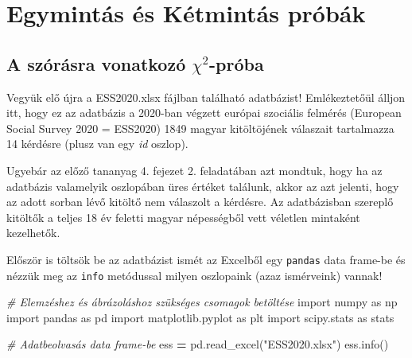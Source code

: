 \documentclass[
]{book}
\newenvironment{Shaded}{\begin{snugshade}}{\end{snugshade}}
\newcommand{\CommentTok}[1]{\textcolor[rgb]{0.56,0.35,0.01}{\textit{#1}}}
\newcommand{\ImportTok}[1]{#1}
\newcommand{\NormalTok}[1]{#1}
\newcommand{\OperatorTok}[1]{\textcolor[rgb]{0.81,0.36,0.00}{\textbf{#1}}}
\newcommand{\StringTok}[1]{\textcolor[rgb]{0.31,0.60,0.02}{#1}}
\begin{document}
\chapter{Egymintás és Kétmintás próbák}\label{egymintuxe1s-uxe9s-kuxe9tmintuxe1s-pruxf3buxe1k}

\section{\texorpdfstring{A szórásra vonatkozó \(\chi^2\)-próba}{A szórásra vonatkozó \textbackslash chi\^{}2-próba}}\label{a-szuxf3ruxe1sra-vonatkozuxf3-chi2-pruxf3ba}

Vegyük elő újra a ESS2020.xlsx fájlban található adatbázist! Emlékeztetőül álljon itt, hogy ez az adatbázis a 2020-ban végzett európai szociális felmérés (European Social Survey 2020 = ESS2020) 1849 magyar kitöltöjének válaszait tartalmazza 14 kérdésre (plusz van egy \emph{id} oszlop).

Ugyebár az előző tananyag 4. fejezet 2. feladatában azt mondtuk, hogy ha az adatbázis valamelyik oszlopában üres értéket találunk, akkor az azt jelenti, hogy az adott sorban lévő kitöltő nem válaszolt a kérdésre. Az adatbázisban szereplő kitöltők a teljes 18 év feletti magyar népességből vett véletlen mintaként kezelhetők.

Először is töltsök be az adatbázist ismét az Excelből egy \texttt{pandas} data frame-be és nézzük meg az \texttt{info} metódussal milyen oszlopaink (azaz ismérveink) vannak!

\begin{Shaded}
\begin{Highlighting}[]
\CommentTok{\# Elemzéshez és ábrázoláshoz szükséges csomagok betöltése}
\ImportTok{import}\NormalTok{ numpy }\ImportTok{as}\NormalTok{ np}
\ImportTok{import}\NormalTok{ pandas }\ImportTok{as}\NormalTok{ pd}
\ImportTok{import}\NormalTok{ matplotlib.pyplot }\ImportTok{as}\NormalTok{ plt}
\ImportTok{import}\NormalTok{ scipy.stats }\ImportTok{as}\NormalTok{ stats}

\CommentTok{\# Adatbeolvasás data frame{-}be}
\NormalTok{ess }\OperatorTok{=}\NormalTok{ pd.read\_excel(}\StringTok{"ESS2020.xlsx"}\NormalTok{)}
\NormalTok{ess.info()}
\end{Highlighting}
\end{Shaded}
\end{document}
